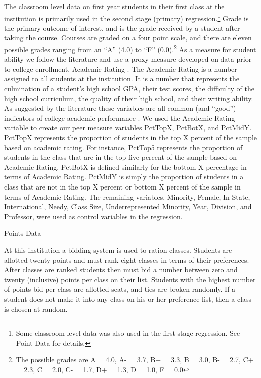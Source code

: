 \documentclass[12pt,a4paper,english,fleqn]{article}
\makeatletter
\renewcommand\subsection{\@startsection{subsection}{2}
{\z@}{-3.25ex\@plus -1ex \@minus -.2ex}{1.5ex \@plus .2ex}{\normalfont\bf}}
\makeatother
\begin{document}
The classroom level data on first year students in their first class at the institution is primarily used in the second stage (primary) regression.\footnote{Some classroom level data was also used in the first stage regression. See Point Data for details.} Grade is the primary outcome of interest, and is the grade received by a student after taking the course. Courses are graded on a four point scale, and there are eleven possible grades ranging from an ``A'' (4.0) to ``F'' (0.0).\footnote{The possible grades are A = 4.0, A- = 3.7, B+ = 3.3, B = 3.0, B- = 2.7, C+ = 2.3, C = 2.0, C- = 1.7, D+ = 1.3, D = 1.0, F = 0.0} As a measure for student ability we follow the literature and use a proxy measure developed on data prior to college enrollment, Academic Rating \citep{griffith2014peer}. The Academic Rating is a number assigned to all students at the institution. It is a number that represents the culmination of a student's high school GPA, their test scores, the difficulty of the high school curriculum, the quality of their high school, and their writing ability. As suggested by the literature these variables are all common (and ``good'') indicators of college academic performance \citep{betts2003determinants,dooley2012persistence}. We used the Academic Rating variable to create our peer measure variables PctTopX, PctBotX, and PctMidY. PctTopX represents the proportion of students in the top X percent of the sample based on academic rating. For instance, PctTop5 represents the proportion of students in the class that are in the top five percent of the sample based on Academic Rating. PctBotX is defined similarly for the bottom X percentage in terms of Academic Rating. PctMidY is simply the proportion of students in a class that are not in the top X percent or bottom X percent of the sample in terms of Academic Rating. The remaining variables, Minority, Female, In-State, International, Needy, Class Size, Underrepresented Minority, Year, Division, and Professor, were used as control variables in the regression. 

\subsection{Points Data}

At this institution a bidding system is used to ration classes. Students are allotted twenty points and must rank eight classes in terms of their preferences. After classes are ranked students then must bid a number between zero and twenty (inclusive) points per class on their list. Students with the highest number of points bid per class are allotted seats, and ties are broken randomly. If a student does not make it into any class on his or her preference list, then a class is chosen at random. 
\end{document}
